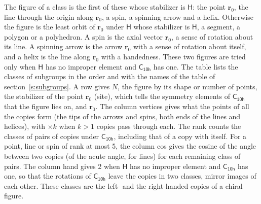 \documentclass[10pt,a4paper]{article}
\numberwithin{equation}{section}
\newcommand{\grp}[1]{\mathsf{#1}}
\newcommand{\pointr}{\mathbf{r}}
\begin{document}
\leavevmode\label{n:head.figure}The figure of a class is the first of these whose stabilizer is $\grp{H}$: the point $\pointr_0$, the line through the origin along $\pointr_0$, a spin, a spinning arrow and a helix. Otherwise the figure is the least orbit of $\pointr_0$ under $\grp{H}$ whose stabilizer is $\grp{H}$, a segment, a polygon or a polyhedron. A spin is the axial vector $\pointr_0$, a sense of rotation about its line. A spinning arrow is the arrow $\pointr_0$ with a sense of rotation about itself, and a helix is the line along $\pointr_0$ with a handedness. These two figures are tried only when $\grp{H}$ has no improper element and $\grp{C_{10h}}$ has one. The table lists the classes of subgroups in the order and with the names of the table of section~\ref{s:subgroups}. \label{n:head.site}A row gives $N$, the figure by its shape or number of points, the stabilizer of the point $\pointr_0$ (site), which tells the symmetry elements of $\grp{C_{10h}}$ that the figure lies on, and $\pointr_0$. \label{n:head.vertices}The column vertices gives what the points of all the copies form (the tips of the arrows and spins, both ends of the lines and helices), with ${\times}k$ when $k > 1$ copies pass through each. \label{n:head.rank}The rank counts the classes of pairs of copies under $\grp{C_{10h}}$, including that of a copy with itself. \label{n:head.cos}For a point, line or spin of rank at most 5, the column cos gives the cosine of the angle between two copies (of the acute angle, for lines) for each remaining class of pairs. \label{n:head.hand}The column hand gives 2 when $\grp{H}$ has no improper element and $\grp{C_{10h}}$ has one, so that the rotations of $\grp{C_{10h}}$ leave the copies in two classes, mirror images of each other. These classes are the left- and the right-handed copies of a chiral figure.
\end{document}

